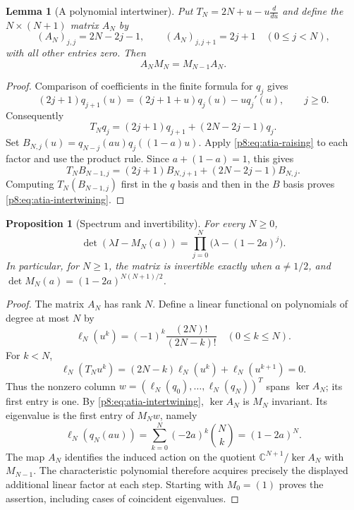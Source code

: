 \documentclass[11pt,a4paper]{article}
\newtheorem{lemma}[theorem]{Lemma}
\newtheorem{proposition}[theorem]{Proposition}
\theoremstyle{definition}
\theoremstyle{remark}
\numberwithin{equation}{section}
\begin{document}
\begin{lemma}[A polynomial intertwiner]
\label{p8:lem:atia-intertwiner}
Put $T_N=2N+u-u\frac{d}{du}$ and define the $N\times(N+1)$ matrix
$A_N$ by
\[
 (A_N)_{j,j}=2N-2j-1,\qquad
 (A_N)_{j,j+1}=2j+1\quad(0\leq j<N),
\]
with all other entries zero.  Then
\begin{equation}\label{p8:eq:atia-intertwining}
 A_NM_N=M_{N-1}A_N.
\end{equation}
\end{lemma}
\begin{proof}
Comparison of coefficients in the finite formula for $q_j$ gives
\begin{equation}\label{p8:eq:atia-raising}
 (2j+1)q_{j+1}(u)=(2j+1+u)q_j(u)-u q_j'(u),
 \qquad j\geq0.
\end{equation}
Consequently
\[
 T_Nq_j=(2j+1)q_{j+1}+(2N-2j-1)q_j.
\]
Set $B_{N,j}(u)=q_{N-j}(au)q_j((1-a)u)$.
Apply \eqref{p8:eq:atia-raising} to each factor and use the product rule.
Since $a+(1-a)=1$, this gives
\[
 T_NB_{N-1,j}=(2j+1)B_{N,j+1}+(2N-2j-1)B_{N,j}.
\]
Computing $T_N(B_{N-1,j})$ first in the $q$ basis and then in the
$B$ basis proves \eqref{p8:eq:atia-intertwining}.
\end{proof}

\begin{proposition}[Spectrum and invertibility]
\label{p8:prop:atia-spectrum}
For every $N\geq0$,
\[
 \det(\lambda I-M_N(a))
 =\prod_{j=0}^N\bigl(\lambda-(1-2a)^j\bigr).
\]
In particular, for $N\geq1$, the matrix is invertible exactly when
$a\ne1/2$, and
$\det M_N(a)=(1-2a)^{N(N+1)/2}$.
\end{proposition}
\begin{proof}
The matrix $A_N$ has rank $N$.  Define a linear functional on polynomials
of degree at most $N$ by
\[
 \ell_N(u^k)=(-1)^k\frac{(2N)!}{(2N-k)!}\quad(0\leq k\leq N).
\]
For $k<N$,
\[
 \ell_N(T_Nu^k)=(2N-k)\ell_N(u^k)+\ell_N(u^{k+1})=0.
\]
Thus the nonzero column $w=(\ell_N(q_0),\ldots,\ell_N(q_N))^T$
spans $\ker A_N$; its first entry is one.
By \eqref{p8:eq:atia-intertwining}, $\ker A_N$ is $M_N$ invariant.
Its eigenvalue is the first entry of $M_Nw$, namely
\[
 \ell_N(q_N(au))
 =\sum_{k=0}^N(-2a)^k\binom Nk=(1-2a)^N.
\]
The map $A_N$ identifies the induced action on the quotient
$\mathbb C^{N+1}/\ker A_N$ with $M_{N-1}$.
The characteristic polynomial therefore acquires precisely the displayed
additional linear factor at each step.  Starting with $M_0=(1)$ proves
the assertion, including cases of coincident eigenvalues.
\end{proof}
\end{document}
